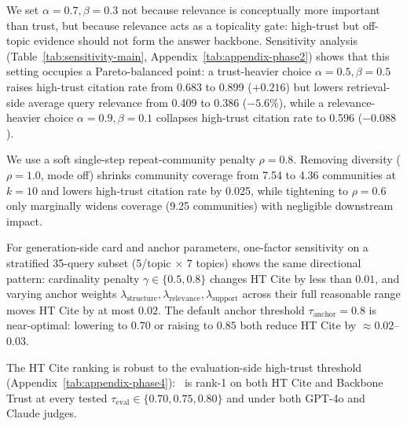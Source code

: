 
We set $\alpha{=}0.7,\beta{=}0.3$ not because relevance is conceptually more important than trust, but because relevance acts as a topicality gate: high-trust but off-topic evidence should not form the answer backbone. Sensitivity analysis (Table~\ref{tab:sensitivity-main}, Appendix~\ref{tab:appendix-phase2}) shows that this setting occupies a Pareto-balanced point: a trust-heavier choice $\alpha{=}0.5,\beta{=}0.5$ raises high-trust citation rate from 0.683 to 0.899 ($+0.216$) but lowers retrieval-side average query relevance from 0.409 to 0.386 ($-5.6\%$), while a relevance-heavier choice $\alpha{=}0.9,\beta{=}0.1$ collapses high-trust citation rate to 0.596 ($-0.088$).

We use a soft single-step repeat-community penalty $\rho{=}0.8$. Removing diversity ($\rho{=}1.0$, mode off) shrinks community coverage from 7.54 to 4.36 communities at $k{=}10$ and lowers high-trust citation rate by 0.025, while tightening to $\rho{=}0.6$ only marginally widens coverage (9.25 communities) with negligible downstream impact.

For generation-side card and anchor parameters, one-factor sensitivity on a stratified 35-query subset (5/topic $\times$ 7 topics) shows the same directional pattern: cardinality penalty $\gamma\in\{0.5,0.8\}$ changes HT Cite by less than $0.01$, and varying anchor weights $\lambda_{\mathrm{structure}},\lambda_{\mathrm{relevance}},\lambda_{\mathrm{support}}$ across their full reasonable range moves HT Cite by at most $0.02$. The default anchor threshold $\tau_{\mathrm{anchor}}{=}0.8$ is near-optimal: lowering to $0.70$ or raising to $0.85$ both reduce HT Cite by $\approx 0.02$--$0.03$.

The HT Cite ranking is robust to the evaluation-side high-trust threshold (Appendix~\ref{tab:appendix-phase4}): \anchorrag\ is rank-1 on both HT Cite and Backbone Trust at every tested $\tau_{\mathrm{eval}}\in\{0.70,0.75,0.80\}$ and under both GPT-4o and Claude judges.

